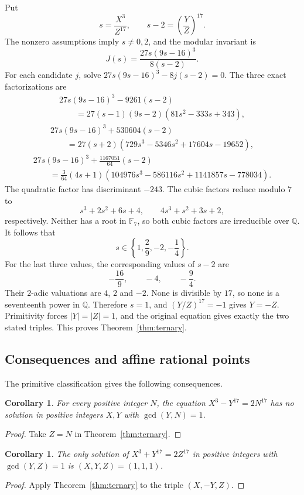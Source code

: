 \documentclass[11pt,a4paper]{article}
\newtheorem{corollary}[theorem]{Corollary}
\theoremstyle{definition}\newtheorem{definition}[theorem]{Definition}
\theoremstyle{remark}\newtheorem{remark}[theorem]{Remark}
\begin{document}
Put
\[
s=\frac{X^3}{Z^{17}},\qquad s-2=\left(\frac YZ\right)^{17}.
\]
The nonzero assumptions imply $s\ne0,2$, and the modular invariant is
\[
J(s)=\frac{27s(9s-16)^3}{8(s-2)}.
\]
For each candidate $j$, solve $27s(9s-16)^3-8j(s-2)=0$. The three exact factorizations are
\[
\begin{array}{l}
27s(9s-16)^3-9261(s-2)\\
\qquad=27(s-1)(9s-2)(81s^2-333s+343),
\end{array}
\]
\[
\begin{array}{l}
27s(9s-16)^3+530604(s-2)\\
\qquad=27(s+2)(729s^3-5346s^2+17604s-19652),
\end{array}
\]
\[
\begin{array}{l}
27s(9s-16)^3+\frac{1167051}{64}(s-2)\\
\qquad=\frac3{64}(4s+1)(104976s^3-586116s^2+1141857s-778034).
\end{array}
\]
The quadratic factor has discriminant $-243$. The cubic factors reduce modulo $7$ to
\[
s^3+2s^2+6s+4,\qquad4s^3+s^2+3s+2,
\]
respectively. Neither has a root in $\mathbb F_7$, so both cubic factors are irreducible over $\mathbb Q$. It follows that
\[
s\in\left\{1,\frac29,-2,-\frac14\right\}.
\]
For the last three values, the corresponding values of $s-2$ are
\[
-\frac{16}{9},\qquad-4,\qquad-\frac94.
\]
Their $2$-adic valuations are $4$, $2$ and $-2$. None is divisible by $17$, so none is a seventeenth power in $\mathbb Q$. Therefore $s=1$, and $(Y/Z)^{17}=-1$ gives $Y=-Z$. Primitivity forces $|Y|=|Z|=1$, and the original equation gives exactly the two stated triples. This proves Theorem~\ref{thm:ternary}.

\subsection{Consequences and affine rational points}

The primitive classification gives the following consequences.

\begin{corollary}\label{cor:fixedN}
For every positive integer $N$, the equation $X^3-Y^{17}=2N^{17}$ has no solution in positive integers $X,Y$ with $\gcd(Y,N)=1$.
\end{corollary}
\begin{proof}
Take $Z=N$ in Theorem~\ref{thm:ternary}.
\end{proof}

\begin{corollary}\label{cor:plus}
The only solution of $X^3+Y^{17}=2Z^{17}$ in positive integers with $\gcd(Y,Z)=1$ is $(X,Y,Z)=(1,1,1)$.
\end{corollary}
\begin{proof}
Apply Theorem~\ref{thm:ternary} to the triple $(X,-Y,Z)$.
\end{proof}
\end{document}
